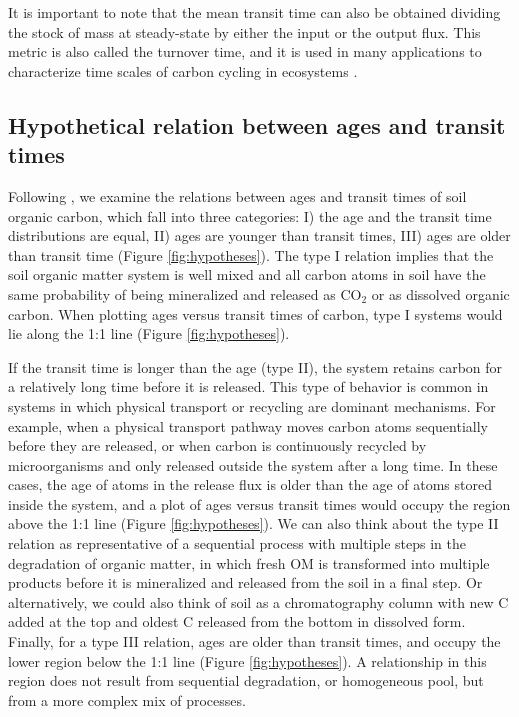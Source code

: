\documentclass[draft,linenumbers]{agujournal}
\begin{document}
It is important to note that the mean transit time can also be obtained dividing the stock of mass at steady-state by either the input or the output flux. This metric is also called the turnover time, and it is used in many applications to characterize time scales of carbon cycling in ecosystems \citep{Sierra2017}. 

\subsection{Hypothetical relation between ages and transit times}
Following \citet{Bolin1973}, we examine the relations between ages and transit times of soil organic carbon, which fall into three categories: I) the age and the transit time distributions are equal, II) ages are younger than transit times, III) ages are older than transit time (Figure \ref{fig:hypotheses}). The type I relation implies that the soil organic matter system is well mixed and all carbon atoms in soil have the same probability of being mineralized and released as CO$_2$ or as dissolved organic carbon. When plotting ages versus transit times of carbon, type I systems would lie along the 1:1 line (Figure \ref{fig:hypotheses}).  


If the transit time is longer than the age (type II), the system retains carbon for a relatively long time before it is released. This type of behavior is common in systems in which physical transport or recycling are dominant mechanisms. For example, when a physical transport pathway moves carbon atoms sequentially before they are released, or when carbon is continuously recycled by microorganisms and only released outside the system after a long time. In these cases, the age of atoms in the release flux is older than the age of atoms stored inside the system, and a plot of ages versus transit times would occupy the region above the 1:1 line (Figure \ref{fig:hypotheses}).
We can also think about the type II relation as representative of a sequential process with multiple steps in the degradation of organic matter, in which fresh OM is transformed into multiple products before it is mineralized and released from the soil in a final step. Or alternatively, we could also think of soil as a chromatography column with new C added at the top and oldest C released from the bottom in dissolved form. Finally, for a type III relation, ages are older than transit times, and occupy the lower region below the 1:1 line (Figure \ref{fig:hypotheses}). A relationship in this region does not result from sequential degradation, or homogeneous pool, but from a more complex mix of processes. 
\end{document}
